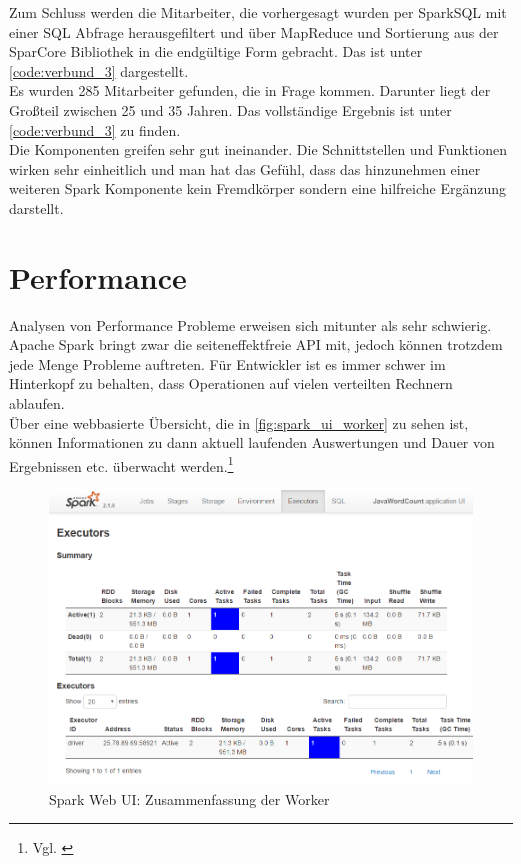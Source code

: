 \noindent
Zum Schluss werden die Mitarbeiter, die vorhergesagt wurden per SparkSQL mit einer SQL Abfrage herausgefiltert und über MapReduce und Sortierung aus der SparCore Bibliothek in die endgültige Form gebracht. Das ist unter \autoref{code:verbund_3} dargestellt. \\

\noindent
Es wurden 285 Mitarbeiter gefunden, die in Frage kommen. Darunter liegt der Großteil zwischen 25 und 35 Jahren. Das vollständige Ergebnis ist unter \autoref{code:verbund_3} zu finden.\\

\noindent
Die Komponenten greifen sehr gut ineinander. Die Schnittstellen und Funktionen wirken sehr einheitlich und man hat das Gefühl, dass das hinzunehmen einer weiteren Spark Komponente kein Fremdkörper sondern eine hilfreiche Ergänzung darstellt.

 




\newpage
\section{Performance}
Analysen von Performance Probleme erweisen sich mitunter als sehr schwierig. Apache Spark bringt zwar die seiteneffektfreie API mit, jedoch können trotzdem jede Menge Probleme auftreten. Für Entwickler ist es immer schwer im Hinterkopf zu behalten, dass Operationen auf vielen verteilten Rechnern ablaufen. \\ 

\noindent
Über eine webbasierte Übersicht, die in \autoref{fig:spark_ui_worker} zu sehen ist, können Informationen zu dann aktuell laufenden Auswertungen und Dauer von Ergebnissen etc. überwacht werden.\footnote{Vgl. \cite[12]{AAWS15}}

\begin{figure}[h]
  \centering
  \includegraphics[width=\textwidth]{./bilder/spark_ui_worker.PNG}
  \caption{Spark Web UI: Zusammenfassung der Worker}\label{fig:spark_ui_worker}
\end{figure}

